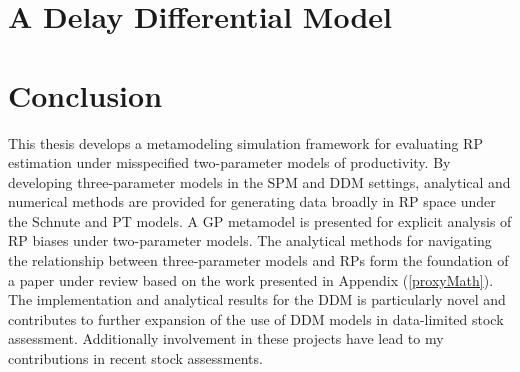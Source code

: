 \documentclass[12pt]{ucscthesis}
\begin{document}
%
\chapter{A Delay Differential Model \label{delayChapter}}


%
\chapter{Conclusion}
\clearpage

%


%

This thesis develops a metamodeling simulation framework for evaluating RP estimation 
under misspecified two-parameter models of productivity. By developing three-parameter 
models in the SPM and DDM settings, analytical and numerical methods are provided for 
generating data broadly in RP space under the Schnute and PT models. A GP metamodel is 
presented for explicit analysis of RP biases under two-parameter models. The analytical 
methods for navigating the relationship between three-parameter models and RPs form the 
foundation of a paper under review based on the work presented in Appendix (\ref{proxyMath}). 
The implementation and analytical results for the DDM is particularly novel and 
contributes to further expansion of the use of DDM models in data-limited stock assessment. 
Additionally involvement in these projects have lead to my contributions in recent stock 
assessments\cite{dick_stock_2023}.   
\end{document}
